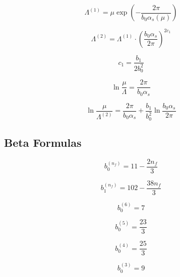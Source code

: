 \documentclass[11pt,a4paper]{article}
\theoremstyle{definition}
\begin{document}
\begin{equation}
\label{eq:cat-6}
\Lambda^{(1)} = \mu\exp\left(-\frac{2\pi}{b_0\alpha_s(\mu)}\right)
\end{equation}

\begin{equation}
\label{eq:cat-7}
\Lambda^{(2)} = \Lambda^{(1)} \cdot \left(\frac{b_0\alpha_s}{2\pi}\right)^{2c_1}
\end{equation}

\begin{equation}
\label{eq:cat-8}
c_1 = \frac{b_1}{2b_0^2}
\end{equation}

\begin{equation}
\label{eq:cat-9}
\ln\frac{\mu}{\Lambda} = \frac{2\pi}{b_0\alpha_s}
\end{equation}

\begin{equation}
\label{eq:cat-10}
\ln\frac{\mu}{\Lambda^{(2)}} = \frac{2\pi}{b_0\alpha_s} + \frac{b_1}{b_0^2}\ln\frac{b_0\alpha_s}{2\pi}
\end{equation}

\subsection{Beta Formulas}
\label{subsec:cat-beta}

\begin{equation}
\label{eq:cat-11}
b_0^{(n_f)} = 11 - \frac{2n_f}{3}
\end{equation}

\begin{equation}
\label{eq:cat-12}
b_1^{(n_f)} = 102 - \frac{38n_f}{3}
\end{equation}

\begin{equation}
\label{eq:cat-13}
b_0^{(6)} = 7
\end{equation}

\begin{equation}
\label{eq:cat-14}
b_0^{(5)} = \frac{23}{3}
\end{equation}

\begin{equation}
\label{eq:cat-15}
b_0^{(4)} = \frac{25}{3}
\end{equation}

\begin{equation}
\label{eq:cat-16}
b_0^{(3)} = 9
\end{equation}
\end{document}
